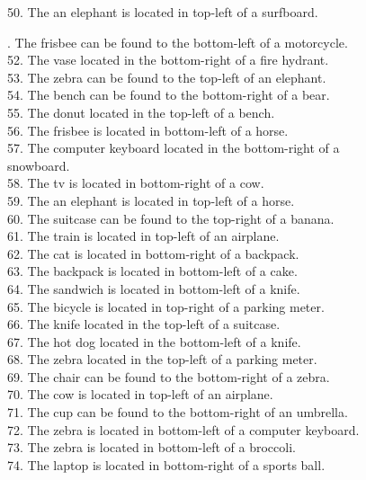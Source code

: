 \begin{figure}[t]
{\begin{minipage}{0.96\textwidth}
\begin{minipage}[t]{0.48\textwidth}
50. The an elephant is located in top-left of a surfboard.\\
\end{minipage}
\hfill
\begin{minipage}[t]{0.48\textwidth}
. The frisbee can be found to the bottom-left of a motorcycle.\\
52. The vase located in the bottom-right of a fire hydrant.\\
53. The zebra can be found to the top-left of an elephant.\\
54. The bench can be found to the bottom-right of a bear.\\
55. The donut located in the top-left of a bench.\\
56. The frisbee is located in bottom-left of a horse.\\
57. The computer keyboard located in the bottom-right of a snowboard.\\
58. The tv is located in bottom-right of a cow.\\
59. The an elephant is located in top-left of a horse.\\
60. The suitcase can be found to the top-right of a banana.\\
61. The train is located in top-left of an airplane.\\
62. The cat is located in bottom-right of a backpack.\\
63. The backpack is located in bottom-left of a cake.\\
64. The sandwich is located in bottom-left of a knife.\\
65. The bicycle is located in top-right of a parking meter.\\
66. The knife located in the top-left of a suitcase.\\
67. The hot dog located in the bottom-left of a knife.\\
68. The zebra located in the top-left of a parking meter.\\
69. The chair can be found to the bottom-right of a zebra.\\
70. The cow is located in top-left of an airplane.\\
71. The cup can be found to the bottom-right of an umbrella.\\
72. The zebra is located in bottom-left of a computer keyboard.\\
73. The zebra is located in bottom-left of a broccoli.\\
74. The laptop is located in bottom-right of a sports ball.\\

\end{minipage}
\end{minipage}}
\end{figure}
